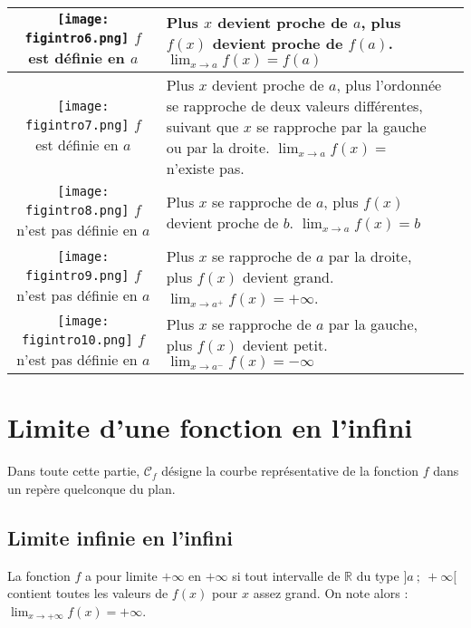 \documentclass{cornouaille}
\begin{document}
\begin{tabularx}{\linewidth}{|c|*{2}{>{\centering \arraybackslash}X|}} \hline
\texttt{[image: figintro6.png]}  $f$ est définie en $a$ & Plus $x$ devient proche de $a$, plus $f(x)$ devient proche de $f(a)$. $\displaystyle \lim_{x\rightarrow a} f(x)=f(a)$ \\ \hline
\texttt{[image: figintro7.png]} $f$ est définie en $a$ &    Plus $x$ devient proche de $a$, plus l'ordonnée se rapproche de deux valeurs différentes, suivant que $x$ se rapproche par la gauche ou par la droite. $\displaystyle \lim_{x\rightarrow a} f(x)=$ n'existe pas.\\ \hline
\texttt{[image: figintro8.png]} $f$ n'est pas définie en $a$ & Plus $x$ se rapproche de $a$, plus $f(x)$ devient proche de $b$. $\displaystyle \lim_{x\rightarrow a} f(x)=b$ \\ \hline
\texttt{[image: figintro9.png]} $f$ n'est pas définie en $a$ &  Plus $x$ se rapproche de $a$ par la droite, plus $f(x)$ devient grand. $\displaystyle \lim_{x\rightarrow a^{+}} f(x) = +\infty$.\\ \hline 
\texttt{[image: figintro10.png]} $f$ n'est pas définie en $a$ &  Plus $x$ se rapproche de $a$ par la gauche, plus $f(x)$ devient petit. $\displaystyle \lim_{x\rightarrow a^{-}} f(x) =  -\infty$ \\ \hline
\end{tabularx}


\section{Limite d'une fonction en l'infini}

Dans toute cette partie, $\mathcal{C}_f$ désigne la courbe représentative de la fonction $f$ dans un repère quelconque du plan.

\subsection{Limite infinie en l'infini}

\begin{definition}
La fonction $f$ a  pour limite $+\infty$ en $+\infty$ si tout intervalle de $\mathbb{R}$  du type  $]a~;~+\infty[$
contient toutes les valeurs de $f(x)$ pour $x$ assez grand. On note alors : $ \lim_{x\to+\infty}f(x)=+\infty$.\\
\end{definition}
\end{document}
